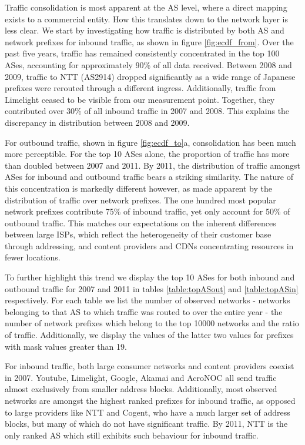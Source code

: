 Traffic consolidation is most apparent at the AS level, where a direct mapping exists to a commercial entity. 
How this translates down to the network layer is less clear. 
We start by investigating how traffic is distributed by both AS and network prefixes for inbound traffic, as shown in figure \ref{fig:ecdf_from}. 
Over the past five years, traffic has remained consistently concentrated in the top 100 ASes, accounting for approximately 90\% of all data received. 
Between 2008 and 2009, traffic to NTT (AS2914) dropped significantly as a wide range of Japanese prefixes were rerouted through a different ingress. 
Additionally, traffic from Limelight ceased to be visible from our measurement point. 
Together, they contributed over 30\% of all inbound traffic in 2007 and 2008. 
This explains the discrepancy in distribution between 2008 and 2009.

For outbound traffic, shown in figure \ref{fig:ecdf_to}a, consolidation has been much more perceptible. 
For the top 10 ASes alone, the proportion of traffic has more than doubled between 2007 and 2011. 
By 2011, the distribution of traffic amongst ASes for inbound and outbound traffic bears a striking similarity. 
The nature of this concentration is markedly different however, as made apparent by the distribution of traffic over network prefixes. 
The one hundred most popular network prefixes contribute 75\% of inbound traffic, yet only account for 50\% of outbound traffic. 
This matches our expectations on the inherent differences between large ISPs, which reflect the heterogeneity of their customer base through addressing, and content providers and CDNs concentrating resources in fewer locations. 



To further highlight this trend we display the top 10 ASes for both inbound and outbound traffic for 2007 and 2011 in tables \ref{table:topASout} and \ref{table:topASin} respectively. For each table we list the number of observed networks - networks belonging to that AS to which traffic was routed to over the entire year - the number of network prefixes which belong to the top 10000 networks and the ratio of traffic. Additionally, we display the values of the latter two values for prefixes with mask values greater than 19.

    For inbound traffic, both large consumer networks and content providers coexist in 2007. Youtube, Limelight, Google, Akamai and AcroNOC all send traffic almost exclusively from smaller address blocks. Additionally, most observed networks are amongst the highest ranked prefixes for inbound traffic, as opposed to large providers like NTT and Cogent, who have a much larger set of address blocks, but many of which do not have significant traffic. By 2011, NTT is the only ranked AS which still exhibits such behaviour for inbound traffic.

